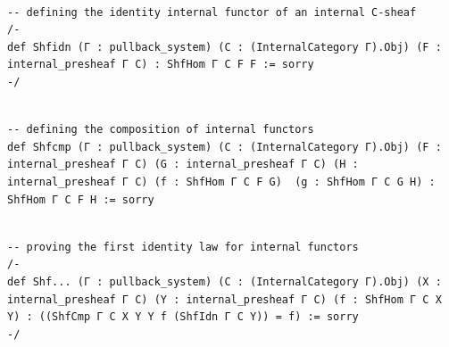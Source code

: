 \documentclass{book}
\theoremstyle{definition}
\newcounter{lcounter}
\begin{document}
\begin{center}
\begin{tcolorbox}[width=5in,colback={white},title={\begin{center}\texttt{Lean \thelcounter} \addtocounter{lcounter}{1}  \end{center}},colbacktitle=Blue,coltitle=black]
\begin{verbatim}

-- defining the identity internal functor of an internal C-sheaf
/-
def Shfidn (Γ : pullback_system) (C : (InternalCategory Γ).Obj) (F : internal_presheaf Γ C) : ShfHom Γ C F F := sorry
-/

\end{verbatim}
\end{tcolorbox}
\end{center}

\begin{center}
\begin{tcolorbox}[width=5in,colback={white},title={\begin{center}\texttt{Lean \thelcounter} \addtocounter{lcounter}{1}  \end{center}},colbacktitle=Blue,coltitle=black]
\begin{verbatim}

-- defining the composition of internal functors
def Shfcmp (Γ : pullback_system) (C : (InternalCategory Γ).Obj) (F : internal_presheaf Γ C) (G : internal_presheaf Γ C) (H : internal_presheaf Γ C) (f : ShfHom Γ C F G)  (g : ShfHom Γ C G H) : ShfHom Γ C F H := sorry

\end{verbatim}
\end{tcolorbox}
\end{center}

\begin{center}
\begin{tcolorbox}[width=5in,colback={white},title={\begin{center}\texttt{Lean \thelcounter} \addtocounter{lcounter}{1}  \end{center}},colbacktitle=Blue,coltitle=black]
\begin{verbatim}

-- proving the first identity law for internal functors
/-
def Shf... (Γ : pullback_system) (C : (InternalCategory Γ).Obj) (X : internal_presheaf Γ C) (Y : internal_presheaf Γ C) (f : ShfHom Γ C X Y) : ((ShfCmp Γ C X Y Y f (ShfIdn Γ C Y)) = f) := sorry
-/

\end{verbatim}
\end{tcolorbox}
\end{center}
\end{document}

